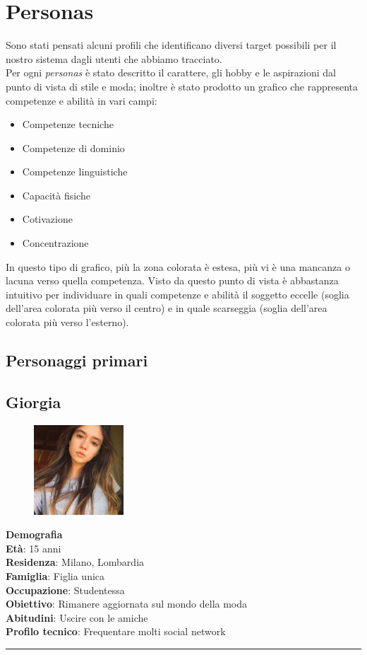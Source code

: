 \documentclass[12pt,a4paper]{report}
\begin{document}
\section{Personas}
Sono stati pensati alcuni profili che identificano diversi target possibili per il nostro sistema dagli utenti che abbiamo tracciato.\\
Per ogni \textit{personas} è stato descritto il carattere, gli hobby e le aspirazioni dal punto di vista di stile e moda; inoltre è stato prodotto un grafico che rappresenta competenze e abilità in vari campi:
\begin{itemize}
  \item Competenze tecniche
  \item Competenze di dominio
  \item Competenze linguistiche
  \item Capacità fisiche
  \item Cotivazione
  \item Concentrazione
\end{itemize}
In questo tipo di grafico, più la zona colorata è estesa, più vi è una mancanza o lacuna verso quella competenza. Visto da questo punto di vista è abbastanza intuitivo per individuare in quali competenze e abilità il soggetto eccelle (soglia dell'area colorata più verso il centro) e in quale scarseggia (soglia dell'area colorata più verso l'esterno).
\subsection{Personaggi primari}
\subsection*{Giorgia}
\begin{figure}
  \centering
    \includegraphics[width=0.3\textwidth]{"Images Latex/Personas/Giorgia"}
\end{figure}
\textbf{Demografia}\\
\indent \textbf{Età}: 15 anni\\
\indent \textbf{Residenza}: Milano, Lombardia\\
\indent \textbf{Famiglia}: Figlia unica\\
\indent \textbf{Occupazione}: Studentessa\\
\textbf{Obiettivo}: Rimanere aggiornata sul mondo della moda\\
\textbf{Abitudini}: Uscire con le amiche\\
\textbf{Profilo tecnico}: Frequentare molti social network\\
\rule{\textwidth}{0.5pt}
\end{document}
